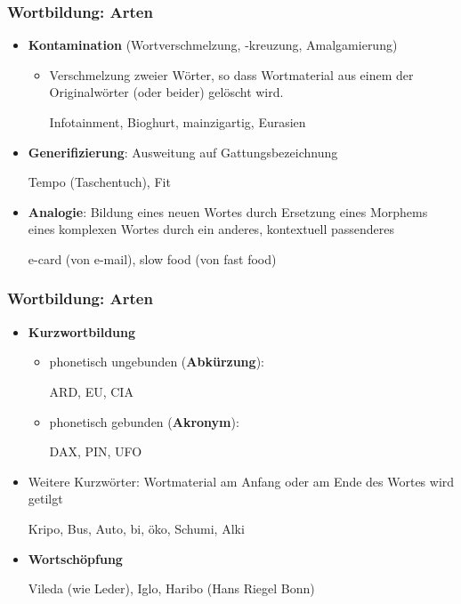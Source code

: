 \begin{frame}
\frametitle{Wortbildung: Arten}

\begin{itemize}
	\item \textbf{Kontamination} (Wortverschmelzung, -kreuzung, Amalgamierung)
	
	\begin{itemize}
		\item Verschmelzung zweier Wörter, so dass Wortmaterial aus einem der Originalwörter (oder beider) gelöscht wird.
		
		\ea Infotainment, Bioghurt, mainzigartig, Eurasien
		\z
	\end{itemize}

	\item \textbf{Generifizierung}: Ausweitung auf Gattungsbezeichnung
		
		\ea Tempo (Taschentuch), Fit
		\z
		
	\item \textbf{Analogie}: Bildung eines neuen Wortes durch Ersetzung eines Morphems eines komplexen Wortes durch ein anderes, kontextuell passenderes
		
		\ea e-card (von e-mail), slow food (von fast food)
		\z
		
	\end{itemize}
	
\end{frame}


\begin{frame}
\frametitle{Wortbildung: Arten}

\begin{itemize}
	\item \textbf{Kurzwortbildung}

\begin{itemize}
	\item phonetisch ungebunden (\textbf{Abkürzung}):
	
	\ea ARD, EU, CIA
	\z
	
	\item phonetisch gebunden (\textbf{Akronym}):
	
	\ea DAX, PIN, UFO
	\z
	
\end{itemize}

\item Weitere Kurzwörter: Wortmaterial am Anfang oder am Ende des Wortes wird getilgt

\ea Kripo, Bus, Auto, bi, öko, Schumi, Alki
\z

	\item \textbf{Wortschöpfung}
	
	\ea Vileda (wie Leder), Iglo, Haribo (Hans Riegel Bonn)
	\z
	
\end{itemize}

\end{frame}


